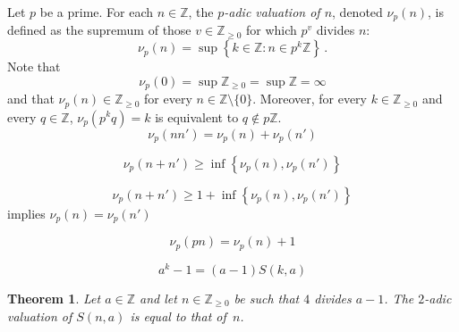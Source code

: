 \documentclass[12pt]{article}
\newcommand{\bZ}{\mathbb{Z}}
\newcommand{\bN}{\bZ_{\ge 0}}%
\newtheorem{theorem}{Theorem}
\theoremstyle{definition}
\begin{document}
Let $p$ be a prime.
For each $n \in \bZ$, the \emph{$p$-adic valuation of $n$}, denoted $\nu_p(n)$,
is defined as the supremum of those $v \in \bN$ for which $p^v$ divides $n$:
$$
\nu_p(n) = \sup \left\{ k \in \bZ : n \in p^k \bZ \right\} \, .
$$
Note that
$$\nu_p(0) = \sup \bN = \sup \bZ = \infty
$$ and that
$\nu_p(n) \in \bN$ for every $n \in \bZ \setminus \{ 0 \}$.
Moreover, for every $k \in \bN$ and every $q \in \bZ$,
$\nu_p(p^k q) = k$ is equivalent to $q \notin p \bZ$.
$$
\nu_p(nn') = \nu_p(n) + \nu_p(n') 
$$

$$
\nu_p(n + n') \ge \inf \left\{ \nu_p(n), \nu_p(n') \right\} 
$$

$$
\nu_p(n + n') \ge 1 + \inf \left\{ \nu_p(n), \nu_p(n') \right\} 
$$
implies $\nu_p(n) = \nu_p(n')$

$$
\nu_p(p n ) = \nu_p(n) + 1
$$
 
\begin{equation} \label{eq:ak-1-a-1-Ska} 
  a^k - 1 = (a - 1) S(k, a) 
\end{equation} 


\begin{theorem} \label{thm:2-adic-S}
  Let $a \in \bZ$ and let $n \in \bN$ be such that $4$ divides $a - 1$.
  The $2$-adic valuation of $S(n, a)$ is equal to that of~$n$.
\end{theorem}
\end{document}
